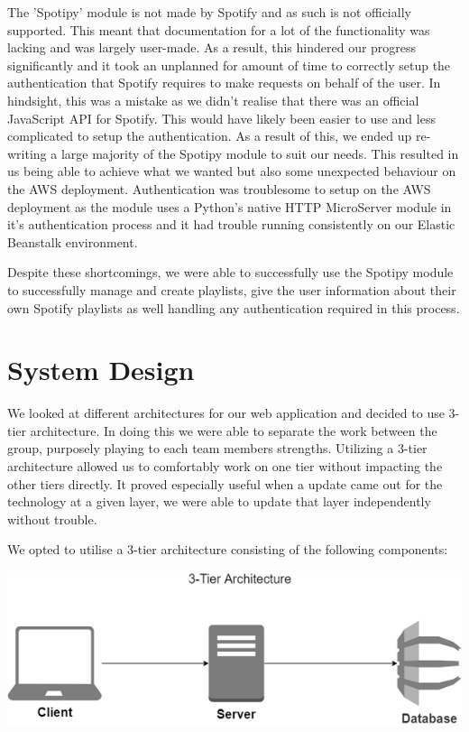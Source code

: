 The 'Spotipy' module is not made by Spotify and as such is not officially supported. This meant that documentation for a lot of the functionality was lacking and was largely user-made. As a result, this hindered our progress significantly and it took an unplanned for amount of time to correctly setup the authentication that Spotify requires to make requests on behalf of the user. In hindsight, this was a mistake as we didn't realise that there was an official JavaScript API for Spotify. 
This would have likely been easier to use and less complicated to setup the authentication. As a result of this, we ended up re-writing a large majority of the Spotipy module to suit our needs. This resulted in us being able to achieve what we wanted but also some unexpected behaviour on the AWS deployment. Authentication was troublesome to setup on the AWS deployment as the module uses a Python's native HTTP MicroServer module in it's authentication process and it had trouble running consistently on our Elastic Beanstalk environment.

Despite these shortcomings, we were able to successfully use the Spotipy module to successfully manage and create playlists, give the user information about their own Spotify playlists as well handling any authentication required in this process.


\chapter{System Design}
We looked at different architectures for our web application and decided to use 3-tier architecture. In doing this we were able to separate the work between the group, purposely playing to each team members strengths. Utilizing a 3-tier architecture allowed us to comfortably work on one tier without impacting the other tiers directly. It proved especially useful when a update came out for the technology at a given layer, we were able to update that layer independently without trouble.\cite{3TierArchitecture}


We opted to utilise a 3-tier architecture consisting of the following components:

\begin{center}    
	\includegraphics{img/3tier.png}
\end{center}

